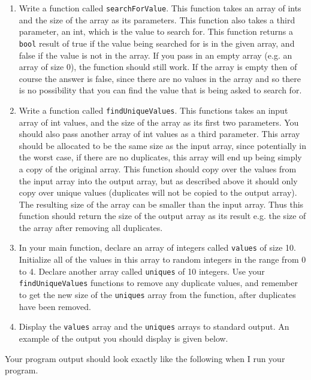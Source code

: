 \documentclass[11pt]{article}
\begin{document}
\begin{enumerate}
\item Write a function called \verb~searchForValue~.  This function takes
an array of ints and the size of the array as its parameters.  This
function also takes a third parameter, an int, which is the value to
search for.  This function returns a \verb~bool~ result of true if the
value being searched for is in the given array, and false if the
value is not in the array.  If you pass in an empty array (e.g. an
array of size 0), the function should still work.  If the array is
empty then of course the answer is false, since there are no values
in the array and so there is no possibility that you can find the
value that is being asked to search for.

\item Write a function called \verb~findUniqueValues~.  This functions
takes an input array of int values, and the size of the array
as its first two parameters.  You should also pass another
array of int values as a third parameter.  This array should
be allocated to be the same size as the input array, since
potentially in the worst case, if there are no duplicates,
this array will end up being simply a copy of the original
array.  This function should copy over the values from
the input array into the output array, but as described above
it should only copy over unique values (duplicates will
not be copied to the output array).  The resulting size of
the array can be smaller than the input array.  Thus this
function should return the size of the output array as
its result e.g. the size of the array after removing all
duplicates.

\item In your main function, declare an array of integers called \verb~values~
of size 10.  Initialize all of the values in this array to random
integers in the range from 0 to 4.  Declare another array called
\verb~uniques~ of 10 integers.  Use your \verb~findUniqueValues~ functions to
remove any duplicate values, and remember to get the new size of
the \verb~uniques~ array from the function, after duplicates have been
removed.

\item Display the \verb~values~ array and the \verb~uniques~ arrays to standard
output.  An example of the output you should display is given below.
\end{enumerate}

Your program output should look exactly like the following when I run
your program. 
\end{document}
